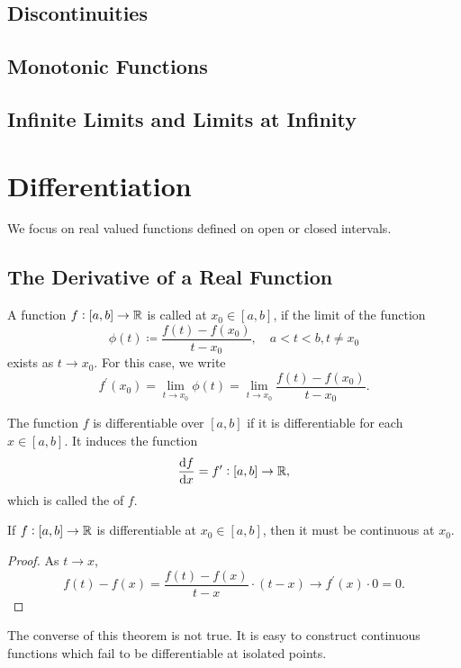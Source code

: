 \section{Discontinuities}

\section{Monotonic Functions}

\section{Infinite Limits and Limits at Infinity}


\chapter{Differentiation}
We focus on real valued functions defined on open or closed intervals.

\section{The Derivative of a Real Function}
\begin{definition}
A function $f:[a,b]\to\mathbb R$ is called  at $x_0\in[a,b]$, if the limit of the function
\[ \phi(t)\coloneqq\frac{f(t)-f(x_0)}{t-x_0}, \quad a<t<b, t\neq x_0 \]
exists as $t\to x_0$. For this case, we write
\begin{equation}\label{eqn:derivative}
f^\prime(x_0)=\lim_{t\to x_0}\phi(t)=\lim_{t\to x_0}\frac{f(t)-f(x_0)}{t-x_0}.
\end{equation}
\end{definition}

The function $f$ is differentiable over $[a,b]$ if it is differentiable for each $x\in[a,b]$. It induces the function
\[ \dv{f}{x}=f^\prime:[a,b]\to\mathbb R, \]
which is called the  of $f$.

\begin{theorem}\label{thrm:diff-cont}
If $f:[a,b]\to\mathbb R$ is differentiable at $x_0\in[a,b]$, then it must be continuous at $x_0$.
\end{theorem}

\begin{proof}
As $t\to x$,
\[ f(t)-f(x)=\frac{f(t)-f(x)}{t-x}\cdot(t-x)\to f^\prime(x)\cdot0=0. \]
\end{proof}

\begin{remark}
The converse of this theorem is not true. It is easy to construct continuous functions which fail to be differentiable at isolated points.
\end{remark}


